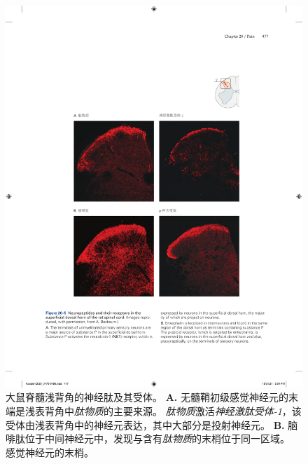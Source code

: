 \begin{figure}[htbp]
	\centering
	\includegraphics[width=0.85\linewidth]{chap20/fig_20_5}
	\caption{大鼠脊髓浅背角的神经肽及其受体。
		\textbf{A.} 无髓鞘初级感觉神经元的末端是浅表背角中\textit{肽物质}的主要来源。
		\textit{肽物质}激活\textit{神经激肽受体-1}，该受体由浅表背角中的神经元表达，其中大部分是投射神经元。
		\textbf{B.} 脑啡肽位于中间神经元中，发现与含有\textit{肽物质}的末梢位于同一区域。
		感觉神经元的末梢。}
	\label{fig:20_5}
\end{figure}



